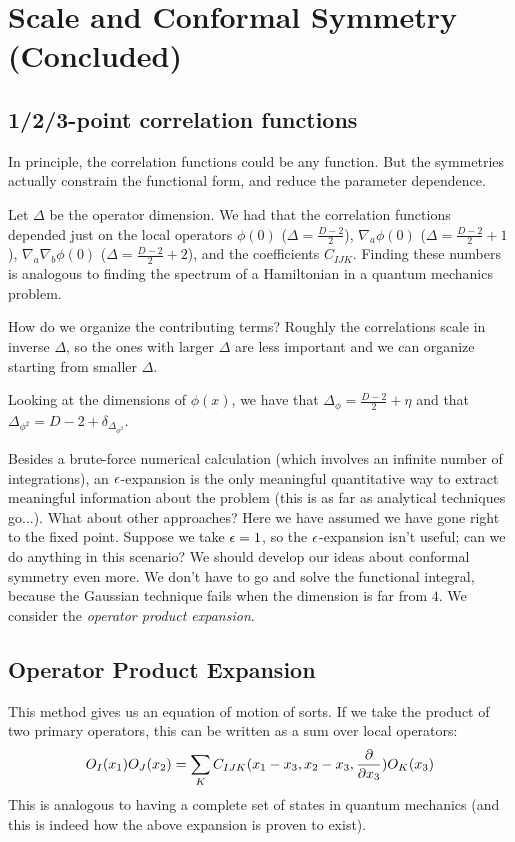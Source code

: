 \section{Scale and Conformal Symmetry (Concluded)}

\subsection{1/2/3-point correlation functions}
In principle, the correlation functions could be any function. But the symmetries actually constrain the functional form, and reduce the parameter dependence. 

Let $\Delta$ be the operator dimension. We had that the correlation functions depended just on the local operators $\phi(0)$ ($\Delta = \frac{D-2}{2}$), $\nabla_a \phi(0)$ ($\Delta = \frac{D-2}{2} + 1$), $\nabla_a\nabla_b\phi(0)$ ($\Delta = \frac{D-2}{2} + 2$), and the coefficients $C_{IJK}$. Finding these numbers is analogous to finding the spectrum of a Hamiltonian in a quantum mechanics problem.

How do we organize the contributing terms? Roughly the correlations scale in inverse $\Delta$, so the ones with larger $\Delta$ are less important and we can organize starting from smaller $\Delta$.

Looking at the dimensions of $\phi(x)$, we have that $\Delta_\phi = \frac{D-2}{2} + \eta$ and that $\Delta_{\phi^2} = D - 2 + \delta_{\Delta_{\phi^2}}$.

Besides a brute-force numerical calculation (which involves an infinite number of integrations), an $\epsilon$-expansion is the only meaningful quantitative way to extract meaningful information about the problem (this is as far as analytical techniques go...). What about other approaches? Here we have assumed we have gone right to the fixed point. Suppose we take $\epsilon = 1$, so the $\epsilon$-expansion isn't useful; can we do anything in this scenario? We should develop our ideas about conformal symmetry even more. We don't have to go and solve the functional integral, because the Gaussian technique fails when the dimension is far from $4$. We consider the \emph{operator product expansion}.

\subsection{Operator Product Expansion}
This method gives us an equation of motion of sorts. If we take the product of two primary operators, this can be written as a sum over local operators:
\begin{equation}
    O_I(x_1)O_J(x_2) = \sum_K C_{IJK}(x_1 - x_3, x_2 - x_3, \frac{\partial }{\partial x_3})O_K(x_3)
\end{equation}
This is analogous to having a complete set of states in quantum mechanics (and this is indeed how the above expansion is proven to exist).

